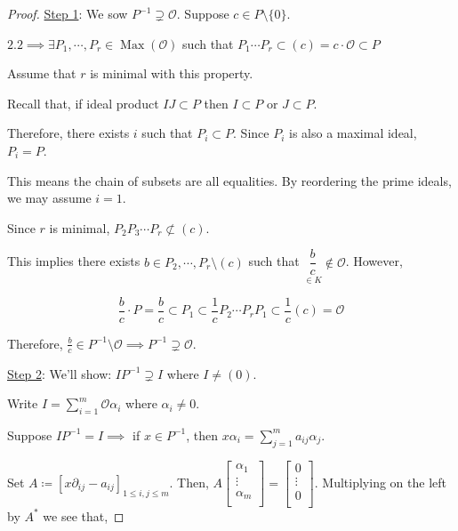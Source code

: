 \documentclass[openany]{amsbook}
\numberwithin{section}{chapter}
\theoremstyle{definition}
\begin{document}
\begin{proof}
    \underline{Step 1}: We sow \(P ^{-1} \supsetneq \mathcal{O}\). Suppose \(c \in P \setminus \{ 0 \} \).

    \(2.2 \implies \exists P_1, \cdots , P_r \in \operatorname{Max}(\mathcal{O}) \) such that \(P_1 \cdots P_r \subset (c) = c \cdot \mathcal{O} \subset P\)

    Assume that \(r\) is minimal with this property.

    Recall that, if ideal product \(IJ \subset P\) then \(I \subset P\) or \(J \subset P\).

    Therefore, there exists \(i\) such that \(P_i \subset P\). Since \(P_i\) is also a maximal ideal, \(P_i = P\).

    This means the chain of subsets are all equalities. By reordering the prime ideals, we may assume \(i = 1\).

    Since \(r\) is minimal, \(P_2 P_3 \cdots P_r \not \subset (c)\).
    
    This implies there exists \(b \in P_2, \cdots , P_r \setminus (c)\) such that \(\underset{\in K}{\dfrac{b}{c}} \notin \mathcal{O} \). However,

    \[
        \frac{b}{c} \cdot P = \frac{b}{c} \subset P_1 \subset \frac{1}{c} P_2 \cdots P_r P_1 \subset \frac{1}{c}(c) = \mathcal{O}
    \]

    Therefore, \(\frac{b}{c} \in P ^{-1} \setminus \mathcal{O} \implies P ^{-1} \supsetneq \mathcal{O}\).

    \underline{Step 2}: We'll show: \(I P ^{-1} \supsetneq I\) where \(I \neq (0)\).

    Write \(I = \sum_{i=1}^{m} \mathcal{O} \alpha_i\) where \(\alpha_i \neq 0\).

    Suppose \(I P ^{-1} = I \implies \) if \(x \in P ^{-1}\), then \(x \alpha _i = \sum_{j=1}^{m} a_{ij} \alpha_j\).

    Set \(A \coloneqq \left[ x \partial _{ij} - a_{ij} \right] _{1 \leq i, j \leq m}\). Then, \(A \begin{bmatrix}
         \alpha_1 \\
         \vdots \\
         \alpha _m \\
    \end{bmatrix} = \begin{bmatrix}
         0 \\
         \vdots \\
         0 \\
    \end{bmatrix}\). Multiplying on the left by \(A^{\ast}\) we see  that,


\end{proof}
\end{document}
